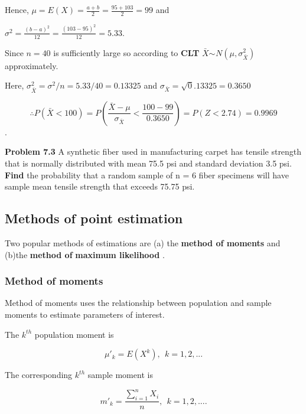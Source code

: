 \documentclass[
  11pt,
  letterpaper,
  DIV=11,
  numbers=noendperiod]{scrreprt}
\begin{document}
Hence, \(\mu=E(X)=\frac{a+b}{2}=\frac{95+103}{2}=99\) and

\(\sigma^2=\frac{(b-a)^2}{12}=\frac{(103-95)^2}{12}=5.33\).

Since \(n=40\) is sufficiently large so according to \textbf{CLT}
\(\bar  X\sim_{} N(\mu, \sigma^2_{\bar X})\) approximately.

Here, \(\sigma^2_{\bar X}=\sigma^2/n=5.33/40=0.13325\) and
\(\sigma_{\bar X}=\sqrt 0.13325=0.3650\)

\[\therefore P(\bar X<100)=P\left(\frac{\bar X-\mu}{\sigma_{\bar X}}< \frac{100-99}{0.3650}\right)=P(Z<2.74)=0.9969\]
.

\textbf{Problem 7.3} A synthetic fiber used in manufacturing carpet has
tensile strength that is normally distributed with mean 75.5 psi and
standard deviation 3.5 psi. \textbf{Find} the probability that a random
sample of n = 6 fiber specimens will have sample mean tensile strength
that exceeds 75.75 psi.\\

\subsection{Methods of point
estimation}\label{methods-of-point-estimation}

Two popular methods of estimations are (a) the \textbf{method of
moments} and (b)the \textbf{method of} \textbf{maximum likelihood} .

\subsubsection{Method of moments}\label{method-of-moments}

Method of moments uses the relationship between population and sample
moments to estimate parameters of interest.

\begin{tcolorbox}[enhanced jigsaw, bottomrule=.15mm, toprule=.15mm, title=\textcolor{quarto-callout-note-color}{\faInfo}\hspace{0.5em}{Moments}, bottomtitle=1mm, colframe=quarto-callout-note-color-frame, coltitle=black, rightrule=.15mm, toptitle=1mm, colbacktitle=quarto-callout-note-color!10!white, titlerule=0mm, breakable, arc=.35mm, leftrule=.75mm, opacitybacktitle=0.6, opacityback=0, colback=white, left=2mm]

The \(k^{th}\) population moment is

\[\mu'{_k}= E(X^k) ,\ \  k=1,2,...\]

The corresponding \(k^{th}\) sample moment is

\[m'_{k}=\frac{\sum_{i=1}^n X_i} {n} , \ \ k=1,2,....\]

\end{tcolorbox}
\end{document}
